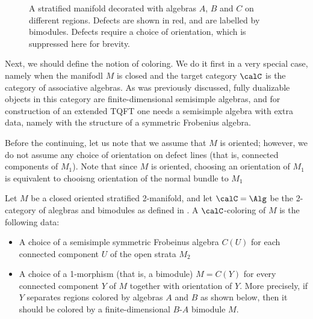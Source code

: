\begin{defectfiguresetup}
\begin{figure}[ht]
	\caption{A stratified manifold decorated with algebras $A$, $B$ and $C$ on
	different regions. Defects are shown in red, and are labelled by bimodules.
	Defects require a choice of orientation, which is suppressed here for
	brevity.}
	\label{f:stratified_pretzel}
\end{figure}

Next, we should define the notion of coloring. We do it first in a very special
case, namely when the manifodl $M$ is closed and the target category $\calC$ is
the category of associative algebras. As was previously discussed, fully
dualizable objects in this category are finite-dimensional semisimple algebras,
and for construction of an extended TQFT one needs a semisimple algebra with
extra data, namely with the structure of a symmetric Frobenius algebra.

Before the continuing, let us note that we assume that $M$ is oriented;
however, we do not assume any choice of orientation on defect lines (that is,
connected components of $M_1$). Note that since $M$ is oriented, choosing an
orientation of $M_1$ is equivalent to chooisng orientation of the normal bundle
to $M_1$

\begin{definition}\label{d:defect-coloring}
  Let $M$ be a closed oriented stratified 2-manifold, and let $\calC=\Alg$ be
  the 2-category of alegbras and bimodules as defined in . A
  $\calC$-coloring of $M$ is the following data:
  \begin{itemize}
    \item A choice of a semisimple symmetric Frobeinus algebra $C(U)$ for each
    connected component $U$ of the open strata $M_2$

    \item A choice of a 1-morphism (that is, a bimodule) $M=C(Y)$ for every
    connected component $Y$ of $M$ together with orientation of $Y$. More
    precisely, if $Y$ separates regions colored by algebras $A$ and $B$ as
    shown below, then it should be colored by a finite-dimensional  $B$-$A$
    bimodule $M$.


\end{itemize}
\end{definition}
\end{defectfiguresetup}
